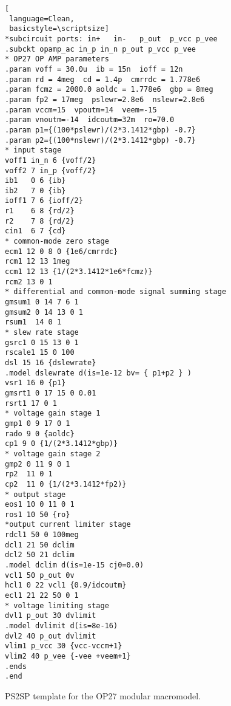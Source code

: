 \begin{figure} 
\begin{lstlisting}[
 language=Clean, 
 basicstyle=\scriptsize]
*subcircuit ports: in+   in-   p_out  p_vcc p_vee 
.subckt opamp_ac in_p in_n p_out p_vcc p_vee
* OP27 OP AMP parameters
.param voff = 30.0u  ib = 15n  ioff = 12n
.param rd = 4meg  cd = 1.4p  cmrrdc = 1.778e6
.param fcmz = 2000.0 aoldc = 1.778e6  gbp = 8meg
.param fp2 = 17meg  pslewr=2.8e6  nslewr=2.8e6
.param vccm=15  vpoutm=14  veem=-15
.param vnoutm=-14  idcoutm=32m  ro=70.0
.param p1={(100*pslewr)/(2*3.1412*gbp) -0.7}
.param p2={(100*nslewr)/(2*3.1412*gbp) -0.7}
* input stage 
voff1 in_n 6 {voff/2}
voff2 7 in_p {voff/2}
ib1   0 6 {ib}
ib2   7 0 {ib}
ioff1 7 6 {ioff/2}
r1    6 8 {rd/2}
r2    7 8 {rd/2}
cin1  6 7 {cd}
* common-mode zero stage
ecm1 12 0 8 0 {1e6/cmrrdc}
rcm1 12 13 1meg
ccm1 12 13 {1/(2*3.1412*1e6*fcmz)}
rcm2 13 0 1
* differential and common-mode signal summing stage
gmsum1 0 14 7 6 1
gmsum2 0 14 13 0 1
rsum1  14 0 1
* slew rate stage
gsrc1 0 15 13 0 1
rscale1 15 0 100
dsl 15 16 {dslewrate}
.model dslewrate d(is=1e-12 bv= { p1+p2 } )
vsr1 16 0 {p1}
gmsrt1 0 17 15 0 0.01
rsrt1 17 0 1
* voltage gain stage 1 
gmp1 0 9 17 0 1
rado 9 0 {aoldc}
cp1 9 0 {1/(2*3.1412*gbp)}
* voltage gain stage 2 
gmp2 0 11 9 0 1
rp2  11 0 1
cp2  11 0 {1/(2*3.1412*fp2)}
* output stage 
eos1 10 0 11 0 1
ros1 10 50 {ro}
*output current limiter stage
rdcl1 50 0 100meg
dcl1 21 50 dclim
dcl2 50 21 dclim 
.model dclim d(is=1e-15 cj0=0.0)
vcl1 50 p_out 0v
hcl1 0 22 vcl1 {0.9/idcoutm}
ecl1 21 22 50 0 1
* voltage limiting stage
dvl1 p_out 30 dvlimit
.model dvlimit d(is=8e-16)
dvl2 40 p_out dvlimit
vlim1 p_vcc 30 {vcc-vccm+1}
vlim2 40 p_vee {-vee +veem+1}
.ends
.end

\end{lstlisting}
  \caption{PS2SP template for the OP27 modular macromodel. } 
  \label{fig:opamp43}
\end{figure}

